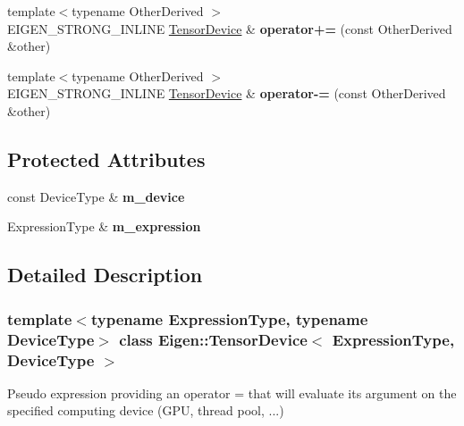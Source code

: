 \begin{DoxyCompactItemize}
\mbox{\label{class_eigen_1_1_tensor_device_a9bc36f8b922b0b2bdf1d99cb592ae988}} 
{\footnotesize template$<$typename Other\+Derived $>$ }\\E\+I\+G\+E\+N\+\_\+\+S\+T\+R\+O\+N\+G\+\_\+\+I\+N\+L\+I\+NE \hyperlink{class_eigen_1_1_tensor_device}{Tensor\+Device} \& {\bfseries operator+=} (const Other\+Derived \&other)
\item 
\mbox{\label{class_eigen_1_1_tensor_device_ab7e44bf8f27d659742a1e6bf1c912f6d}} 
{\footnotesize template$<$typename Other\+Derived $>$ }\\E\+I\+G\+E\+N\+\_\+\+S\+T\+R\+O\+N\+G\+\_\+\+I\+N\+L\+I\+NE \hyperlink{class_eigen_1_1_tensor_device}{Tensor\+Device} \& {\bfseries operator-\/=} (const Other\+Derived \&other)
\end{DoxyCompactItemize}
\subsection*{Protected Attributes}
\begin{DoxyCompactItemize}
\item 
\mbox{\label{class_eigen_1_1_tensor_device_a9c4fd4e99368f89845f3b0f39602043c}} 
const Device\+Type \& {\bfseries m\+\_\+device}
\item 
\mbox{\label{class_eigen_1_1_tensor_device_a41b0b5e529684040089982b4b6cd5d8e}} 
Expression\+Type \& {\bfseries m\+\_\+expression}
\end{DoxyCompactItemize}


\subsection{Detailed Description}
\subsubsection*{template$<$typename Expression\+Type, typename Device\+Type$>$\newline
class Eigen\+::\+Tensor\+Device$<$ Expression\+Type, Device\+Type $>$}

Pseudo expression providing an operator = that will evaluate its argument on the specified computing \textquotesingle{}device\textquotesingle{} (G\+PU, thread pool, ...) 

